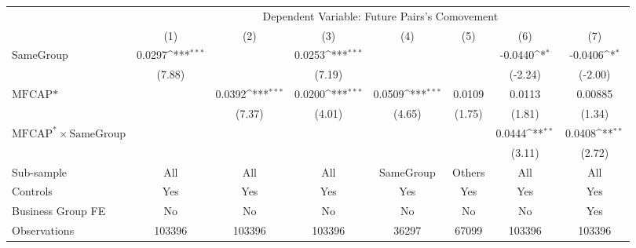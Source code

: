 {
\def\sym#1{\ifmmode^{#1}\else\(^{#1}\)\fi}
\begin{tabular}{l*{7}{c}}
\hline\hline
                &\multicolumn{7}{c}{Dependent Variable:  Future Pairs's Comovement}                                                                  \\\cmidrule(lr){2-8}
                &\multicolumn{1}{c}{(1)}         &\multicolumn{1}{c}{(2)}         &\multicolumn{1}{c}{(3)}         &\multicolumn{1}{c}{(4)}         &\multicolumn{1}{c}{(5)}         &\multicolumn{1}{c}{(6)}         &\multicolumn{1}{c}{(7)}         \\
\hline
SameGroup       &   0.0297\sym{***}&                  &   0.0253\sym{***}&                  &                  &  -0.0440\sym{*}  &  -0.0406\sym{*}  \\
                &   (7.88)         &                  &   (7.19)         &                  &                  &  (-2.24)         &  (-2.00)         \\
[1em]
$ \text{MFCAP*} $&                  &   0.0392\sym{***}&   0.0200\sym{***}&   0.0509\sym{***}&   0.0109         &   0.0113         &  0.00885         \\
                &                  &   (7.37)         &   (4.01)         &   (4.65)         &   (1.75)         &   (1.81)         &   (1.34)         \\
[1em]
 $ \text{MFCAP}^* \times {\text{SameGroup} }  $ &                  &                  &                  &                  &                  &   0.0444\sym{**} &   0.0408\sym{**} \\
                &                  &                  &                  &                  &                  &   (3.11)         &   (2.72)         \\
\hline
Sub-sample      &      All         &      All         &      All         &SameGroup         &   Others         &      All         &      All         \\
Controls        &      Yes         &      Yes         &      Yes         &      Yes         &      Yes         &      Yes         &      Yes         \\
Business Group FE&       No         &       No         &       No         &       No         &       No         &       No         &      Yes         \\
Observations    &   103396         &   103396         &   103396         &    36297         &    67099         &   103396         &   103396         \\
\hline\hline  \end{tabular}}
